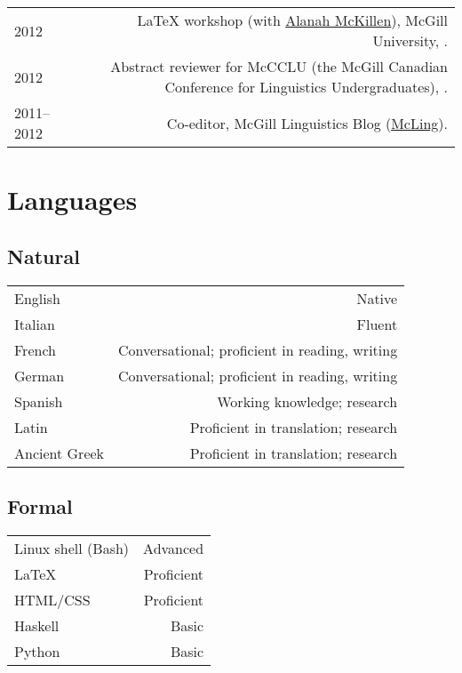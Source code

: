 \documentclass[10pt,letterpaper]{article}
\makeatletter
\newcommand{\formatdatenoday}[2]{\mydatenoday\formatdate{0}{#1}{#2}}
\newcommand{\myvrule}{\color{lightgray}\vrule width 1.0pt}
\newenvironment{cvsection}{%
  \renewcommand{\arraystretch}{1.60}
  \begin{longtable}[l]{@{} L R @{}}
}{%
  \end{longtable}
}
\makeatother
\begin{document}
\begin{cvsection}
  2012 & \LaTeX{} workshop (with
  \href{http://people.linguistics.mcgill.ca/~alanah.mckillen/}{Alanah
  McKillen}), McGill University, . \\

  2012 & Abstract reviewer for McCCLU (the McGill Canadian Conference for
  Linguistics Undergraduates), \formatdatenoday{1}{2012}. \\


  2011--2012 & Co-editor, McGill Linguistics Blog
  (\href{https://blogs.mcgill.ca/mcling/}{McLing}). \\
\end{cvsection}

\section*{Languages}

\vspace{1ex}
\subsection*{Natural}

\begin{cvsection}
  English & Native \\
  Italian & Fluent \\
  French & Conversational; proficient in reading, writing \\
  German & Conversational; proficient in reading, writing \\
  Spanish & Working knowledge; research \\
  Latin & Proficient in translation; research \\
  Ancient Greek & Proficient in translation; research \\
\end{cvsection}

\vspace{-2ex}
\subsection*{Formal}

\begin{cvsection}
  Linux shell {\footnotesize (Bash)} & Advanced \\
  \LaTeX{} & Proficient \\
  HTML/CSS & Proficient \\
  Haskell & Basic \\
  Python & Basic \\
\end{cvsection}
\end{document}
